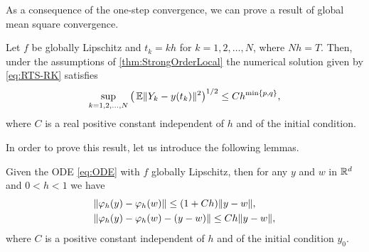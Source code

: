 \documentclass[10pt]{article}
\begin{document}
As a consequence of the one-step convergence, we can prove a result of global mean square convergence.
\begin{theorem}\label{thm:StrongOrder} Let $f$ be globally Lipschitz and $t_k = kh$ for $k = 1, 2, \ldots, N$, where $Nh = T$. Then, under the assumptions of \cref{thm:StrongOrderLocal} the numerical solution given by \eqref{eq:RTS-RK} satisfies 
	\begin{equation}\label{eq:StrongGlobal}
		\sup_{k=1,2, \ldots, N} \big(\operatorname{\mathbb{E}}\lVert Y_k - y(t_k)\rVert^2\big)^{1/2} \leq C h^{\min\{p, q\}},
	\end{equation}
	where $C$ is a real positive constant independent of $h$ and of the initial condition.
\end{theorem}
In order to prove this result, let us introduce the following lemmas.
\begin{lemma}\label{lem:ODERepresentation} Given the ODE \eqref{eq:ODE} with $f$ globally Lipschitz, then for any $y$ and $w$ in $\mathbb{R}^d$ and $0 < h < 1$ we have
	\begin{align}
		&\lVert\varphi_h(y) - \varphi_h(w)\rVert \leq (1 + Ch) \lVert y - w\rVert,\label{eq:FlowLipschitz}\\
		&\lVert\varphi_h(y) - \varphi_h(w) - (y - w)\rVert \leq Ch\lVert y - w\rVert,\label{eq:FlowLipschitzBoundRem}
	\end{align}
	where $C$ is a positive constant independent of $h$ and of the initial condition $y_0$.
\end{lemma}
\end{document}
